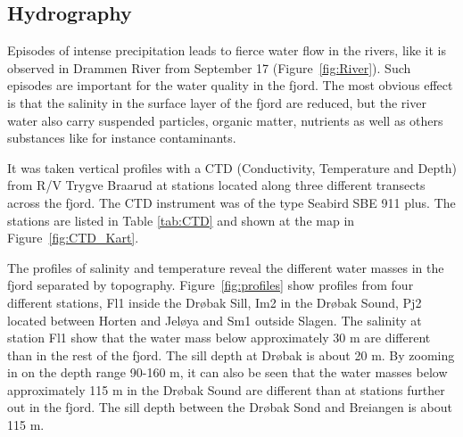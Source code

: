 \documentclass[12pt,a4paper,english]{article}
\begin{document}

%
%
%

\clearpage

\subsection{Hydrography}
\label{sect:hydro}
Episodes of intense precipitation leads to fierce water flow in the rivers, 
like it is observed in Drammen River from September 17 (Figure~\ref{fig:River}).
Such episodes are important for the water quality in the fjord. 
The most obvious effect is that the salinity in the surface layer of the fjord 
are reduced, but the river water also carry suspended particles, organic matter, 
nutrients as well as others substances like for instance contaminants.       

It was taken vertical profiles with a CTD (Conductivity, Temperature and Depth)
from R/V Trygve Braarud 
at stations located along three different transects across the fjord. 
The CTD instrument was of the type Seabird SBE 911 plus.
The stations are listed in Table \ref{tab:CTD} and shown at the map in 
Figure~\ref{fig:CTD_Kart}. 

The profiles of salinity and temperature reveal the different water masses in 
the fjord separated by topography. Figure~\ref{fig:profiles} show profiles from 
four different stations, Fl1 inside the Dr{\o}bak Sill, Im2 in the Dr{\o}bak Sound, 
Pj2 located between Horten and Jel{\o}ya and Sm1 outside Slagen. 
The salinity at station Fl1 show that the water mass below approximately 30 m 
are different than in the rest of the fjord. 
The sill depth at Dr{\o}bak is about 20 m. 
By zooming in on the depth range 90-160 m, it can also be seen that the water 
masses below approximately 115 m in the Dr{\o}bak Sound are different than at 
stations further out in the fjord. The sill depth between the Dr{\o}bak Sond and 
Breiangen is about 115 m. 
\end{document}
